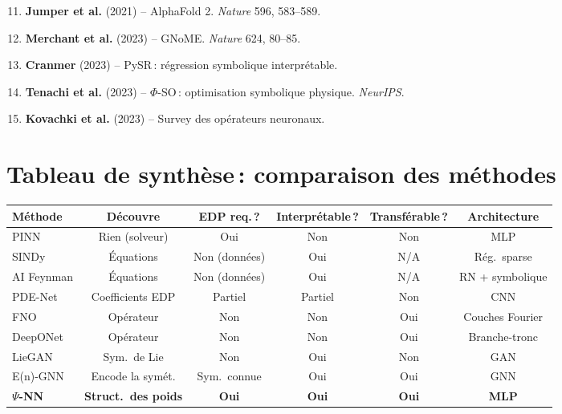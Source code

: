 \documentclass[11pt,a4paper]{article}
\begin{document}
\begin{enumerate}[leftmargin=1.8em,itemsep=3pt]
\setcounter{enumi}{10}
\item \textbf{Jumper et al.} (2021) -- AlphaFold 2. \textit{Nature} 596, 583--589.
\item \textbf{Merchant et al.} (2023) -- GNoME. \textit{Nature} 624, 80--85.
\item \textbf{Cranmer} (2023) -- PySR\,: régression symbolique interprétable.
\item \textbf{Tenachi et al.} (2023) -- $\Phi$-SO\,: optimisation symbolique physique. \textit{NeurIPS}.
\item \textbf{Kovachki et al.} (2023) -- Survey des opérateurs neuronaux.
\end{enumerate}

\section{Tableau de synthèse\,: comparaison des méthodes}

\begin{center}
\small
\renewcommand{\arraystretch}{1.25}
\begin{tabular}{@{}l c c c c c@{}}
\toprule
\textbf{Méthode} & \textbf{Découvre} & \textbf{EDP req.\,?} & \textbf{Interprétable\,?} & \textbf{Transférable\,?} & \textbf{Architecture} \\
\midrule
PINN & Rien (solveur) & Oui & Non & Non & MLP \\
SINDy & Équations & Non (données) & Oui & N/A & Rég.\ sparse \\
AI Feynman & Équations & Non (données) & Oui & N/A & RN + symbolique \\
PDE-Net & Coefficients EDP & Partiel & Partiel & Non & CNN \\
FNO & Opérateur & Non & Non & Oui & Couches Fourier \\
DeepONet & Opérateur & Non & Non & Oui & Branche-tronc \\
LieGAN & Sym.\ de Lie & Non & Oui & Non & GAN \\
E(n)-GNN & Encode la symét. & Sym.\ connue & Oui & Oui & GNN \\
\textbf{$\Psi$-NN} & \textbf{Struct.\ des poids} & \textbf{Oui} & \textbf{Oui} & \textbf{Oui} & \textbf{MLP} \\
\bottomrule
\end{tabular}
\end{center}
\end{document}
